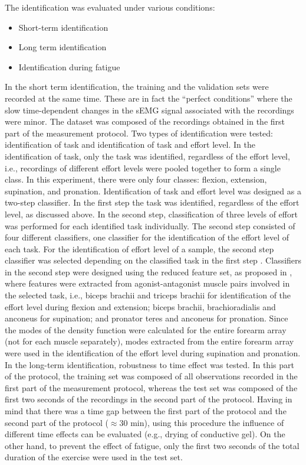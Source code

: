 The identification was evaluated under various conditions:

\begin{itemize}
\item Short-term identification
\item Long term identification
\item Identification during fatigue
\end{itemize}

In the short term identification, the training and the validation sets were recorded at the same time. These are in fact the “perfect conditions” where the slow time-dependent changes in the sEMG signal associated with the recordings were minor. The dataset was composed of the recordings obtained in the first part of the measurement protocol.
Two types of identification were tested: identification of task and identification of task and effort level. In the identification of task, only the task was identified, regardless of the effort level, i.e., recordings of different effort levels were pooled together to form a single class. In this experiment, there were only four classes: flexion, extension, supination, and pronation. Identification of task and effort level was designed as a two-step classifier. In the first step the task was identified, regardless of the effort level, as discussed above. In the second step, classification of three levels of effort was performed for each identified task individually. The second step consisted of four different classifiers, one classifier for the identification of the effort level of each task. For the identification of effort level of a sample, the second step classifier was selected depending on the classified task in the first step \citep{Jordanic2016b}. Classifiers in the second step were designed using the reduced feature set, as proposed in \citep{Jordanic2016b}, where features were extracted from agonist-antagonist muscle pairs involved in the selected task, i.e., biceps brachii and triceps brachii for identification of the effort level during flexion and extension; biceps brachii, brachioradialis and anconeus for supination; and pronator teres and anconeus for pronation. Since the modes of the density function were calculated for the entire forearm array (not for each muscle separately), modes extracted from the entire forearm array were used in the identification of the effort level during supination and pronation.
In the long-term identification, robustness to time effect was tested. In this part of the protocol, the training set was composed of all observations recorded in the first part of the measurement protocol, whereas the test set was composed of the first two seconds of the recordings in the second part of the protocol. Having in mind that there was a time gap between the first part of the protocol and the second part of the protocol ($\approx$30 min), using this procedure the influence of different time effects can be evaluated (e.g., drying of conductive gel). On the other hand, to prevent the effect of fatigue, only the first two seconds of the total duration of the exercise were used in the test set.
